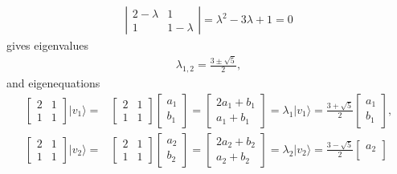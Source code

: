 \documentclass[en]{sol-man}
\begin{document}
\begin{sol}
\begin{align}
        \left\lvert\begin{matrix}
            2-\lambda&1\\
            1&1-\lambda
        \end{matrix}\right\rvert=\lambda^2-3\lambda+1=0
    \end{align}
    gives eigenvalues
    \begin{align}
        \lambda_{1,2}=\frac{3\pm\sqrt{5}}{2},
    \end{align}
    and eigenequations
    \begin{align}
        \begin{bmatrix}
            2&1\\
            1&1
        \end{bmatrix}\lvert v_1\rangle=&\begin{bmatrix}
            2&1\\
            1&1
        \end{bmatrix}\begin{bmatrix}
            a_1\\
            b_1
        \end{bmatrix}=\begin{bmatrix}
            2a_1+b_1\\
            a_1+b_1
        \end{bmatrix}=\lambda_1\lvert v_1\rangle=\frac{3+\sqrt{5}}{2}\begin{bmatrix}
            a_1\\
            b_1
        \end{bmatrix},\\
        \begin{bmatrix}
            2&1\\
            1&1
        \end{bmatrix}\lvert v_2\rangle=&\begin{bmatrix}
            2&1\\
            1&1
        \end{bmatrix}\begin{bmatrix}
            a_2\\
            b_2
        \end{bmatrix}=\begin{bmatrix}
            2a_2+b_2\\
            a_2+b_2
        \end{bmatrix}=\lambda_2\lvert v_2\rangle=\frac{3-\sqrt{5}}{2}\begin{bmatrix}
            a_2\\

\end{bmatrix}
\end{align}
\end{sol}
\end{document}
